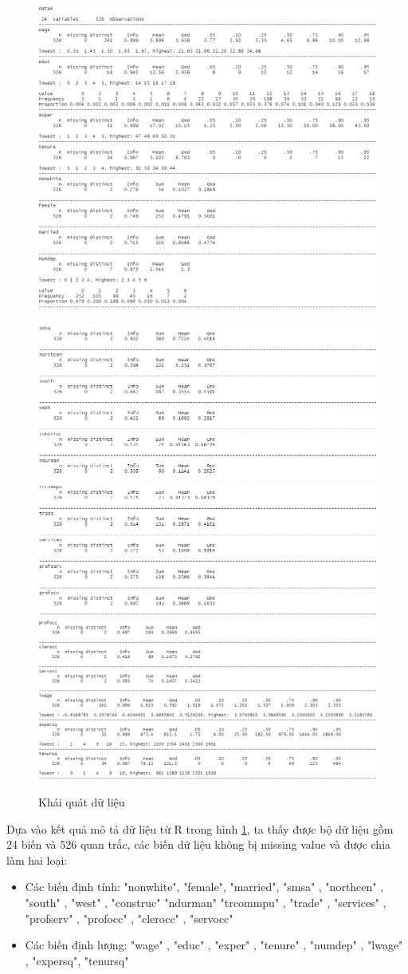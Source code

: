 \begin{figure}[H]
	\centering
	{\includegraphics[width=0.63\linewidth]{../Photo Of Result/describe(4)-1}}
\end{figure}
\begin{figure}[H]
	\centering
	{\includegraphics[width=0.63\linewidth]{../Photo Of Result/describe(4)-2}}
	{\includegraphics[width=0.63\linewidth]{../Photo Of Result/describe(4)-3}}
	\caption{Khái quát dữ liệu}
	\label{describe-4}
\end{figure}

Dựa vào kết quả mô tả dữ liệu từ R trong hình \ref{describe-4}, ta thấy được bộ dữ liệu gồm  24 biến và 526 quan trắc, các biến dữ liệu không bị missing value và được chia làm hai loại:
\begin{itemize}
	\item Các biến định tính: "nonwhite", "female", "married", "smsa"  ,   "northcen" , "south"  ,  "west"  ,   "construc" "ndurman"  "trcommpu" , "trade" ,   "services" , "profserv" , "profocc" , "clerocc" , "servocc" 
	\item Các biến định lượng: "wage"  ,  "educ"  ,  "exper" ,  "tenure" , "numdep" , "lwage" ,  "expersq", "tenursq"
\end{itemize}

